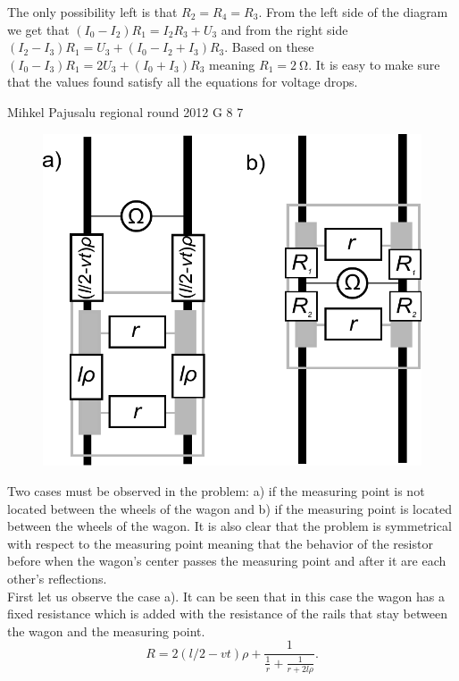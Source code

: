 \documentclass[11pt]{article}
\begin{document}
{The only possibility left is that $R_2=R_4=R_3$. From the left side of the diagram we get that $(I_0-I_2)R_1=I_2R_3+U_3$ and from the right side $(I_2-I_3)R_1=U_3+(I_0-I_2+I_3)R_3$. Based on these $(I_0-I_3)R_1=2U_3+(I_0+I_3)R_3$ meaning $R_1=\SI{2}{\ohm}$. It is easy to make sure that the values found satisfy all the equations for voltage drops.
\fi
}

{Mihkel Pajusalu} %
{regional round} %
{2012} %
{G 8} %
{7} %
{

\ifEngSolution
\begin{figure}
\includegraphics[width=\linewidth]{2012-v2g-08-rong_lahendus}
\end{figure}
Two cases must be observed in the problem: a) if the measuring point is not located between the wheels of the wagon and b) if the measuring point is located between the wheels of the wagon. It is also clear that the problem is symmetrical with respect to the measuring point meaning that the behavior of the resistor before when the wagon’s center passes the measuring point and after it are each other’s reflections.\\
First let us observe the case a). It can be seen that in this case the wagon has a fixed resistance which is added with the resistance of the rails that stay between the wagon and the measuring point. 
\[
R=2(l/2-vt)\rho+\frac{1}{\frac{1}{r}+\frac{1}{r+2l\rho}}.
\]}
\end{document}

